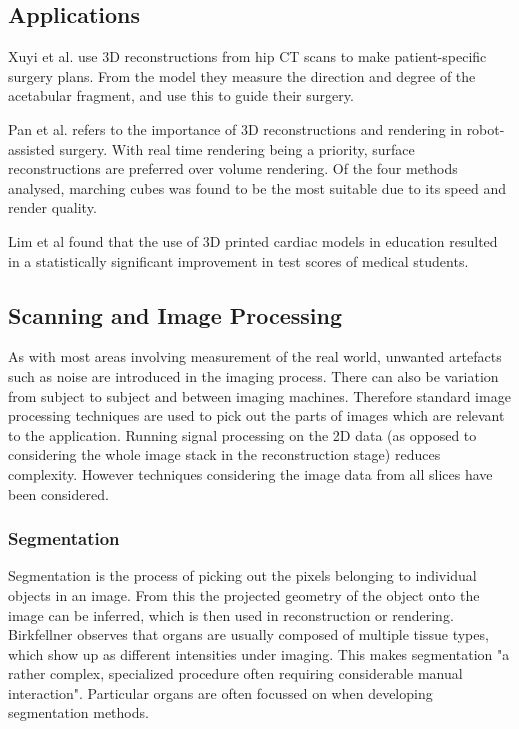 \documentclass[11p, titlepage]{article}
\begin{document}
\subsection{Applications}

Xuyi et al. \cite{xuyi2016application} use 3D reconstructions from hip CT scans to make patient-specific surgery plans. From the model they measure the direction and degree of the acetabular fragment, and use this to guide their surgery.

Pan et al. \cite{pan2017comparison} refers to the importance of 3D reconstructions and rendering in robot-assisted surgery. With real time rendering being a priority, surface reconstructions are preferred over volume rendering. Of the four methods analysed, marching cubes was found to be the most suitable due to its speed and render quality.

Lim et al \cite{lim2016use} found that the use of 3D printed cardiac models in education resulted in a statistically significant improvement in test scores of medical students.

\subsection{Scanning and Image Processing}

As with most areas involving measurement of the real world, unwanted artefacts such as noise are introduced in the imaging process. There can also be variation from subject to subject and between imaging machines. Therefore standard image processing techniques are used to pick out the parts of images which are relevant to the application. Running signal processing on the 2D data (as opposed to considering the whole image stack in the reconstruction stage) reduces complexity. However techniques considering the image data from all slices have been considered.

\subsubsection{Segmentation}

Segmentation is the process of picking out the pixels belonging to individual objects in an image. From this the projected geometry of the object onto the image can be inferred, which is then used in reconstruction or rendering. Birkfellner \cite{birkfellner2016applied} observes that organs are usually composed of multiple tissue types, which show up as different intensities under imaging. This makes segmentation "a rather complex, specialized procedure often requiring considerable manual interaction". Particular organs are often focussed on when developing segmentation methods.
\end{document}
